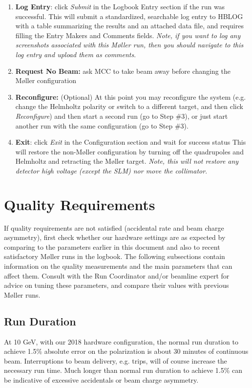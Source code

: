 \documentclass[amsmath,amssymb,notitlepage,12pt]{revtex4}
\begin{document}
\begin{enumerate}
\item {\bf Log Entry}: click {\em Submit} in the Logbook Entry section if the run was successful. 
    \subitem This will submit a standardized, searchable log entry to HBLOG with a table summarizing the results and an attached data file, and requires filling the Entry Makers and Comments fields.  {\em Note, if you want to log any screenshots associated with this M{\o}ller run, then you should navigate to this log entry and upload them as comments}.
\item {\bf Request No Beam:} ask MCC to take beam away before changing the M{\o}ller configuration
\item {\bf Reconfigure:}  (Optional)  At this point you may reconfigure the system (e.g. change the Helmholtz polarity or switch to a different target, and then click {\em Reconfigure}) and then start a second run (go to Step \#3), or just start another run with the same configuration (go to Step \#3).
\item {\bf Exit}: click {\em Exit} in the Configuration section and wait for success status
    \subitem  This will restore the non-M{\o}ller configuration by turning off the quadrupoles and Helmholtz and retracting the M{\o}ller target.  {\em Note, this will not restore any detector high voltage (except the SLM) nor move the collimator}. 
\end{enumerate}

\newpage

\section{Quality Requirements}\label{sec:knobs}

If quality requirements are not satisfied (accidental rate and beam charge asymmetry), first check whether our hardware settings are as expected by comparing to the parameters earlier in this document and also to recent satisfactory M{\o}ller runs in the logbook.  The following subsections contain information on the quality measurements and the main parameters that can affect them.  Consult with the Run Coordinator and/or beamline expert for advice on tuning these parameters, and compare their values with previous M{\o}ller runs.

\subsection{Run Duration}
At 10 GeV, with our 2018 hardware configuration, the normal run duration to achieve 1.5\% absolute error on the polarization is about 30 minutes of continuous beam.  Interruptions to beam delivery, e.g. trips, will of course increase the necessary run time.  Much longer than normal run duration to achieve 1.5\% can be indicative of excessive accidentals or beam charge asymmetry.
\end{document}
